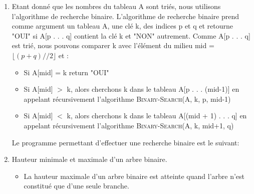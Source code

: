 \begin{Exercice}[20 minutes]
\begin{enumerate}
	\end{enumerate}
	\begin{solution}
		\begin{enumerate}
			\item Etant donné que les nombres du tableau A sont triés, nous utilisons l'algorithme de recherche binaire. L'algorithme de recherche binaire  prend comme argument un tableau A, une clé k, des indices p et q et retourne "OUI" si A[p . . . q]  contient la clé k et "NON" autrement. Comme A[p . . . q] est trié, nous pouvons comparer k avec l'élément du milieu mid = $\lfloor(p+q)//2\rfloor$  et : \\
				\begin{itemize}
					\item Si A[mid] = k return "OUI" \\
					\item Si A[mid] $>$ k, alors cherchons k dans le tableau A[p . . . (mid-1)] en appelant récursivement l'algorithme \textsc{Binary-Search}(A, k, p, mid-1) \\
					\item Si A[mid] $<$ k, alors cherchons k dans le tableau A[(mid + 1) . . . q] en appelant récursivement l'algorithme \textsc{Binary-Search}(A, k, mid+1, q)\\
				\end{itemize}
				Le programme permettant d'effectuer une recherche binaire est le suivant:
				
			\item Hauteur minimale et maximale d'un arbre binaire.
				\begin{itemize}
					\item La hauteur maximale d'un arbre binaire est atteinte quand l'arbre n'est constitué que d'une seule branche. \\
					

\end{itemize}
\end{enumerate}
\end{solution}
\end{Exercice}
